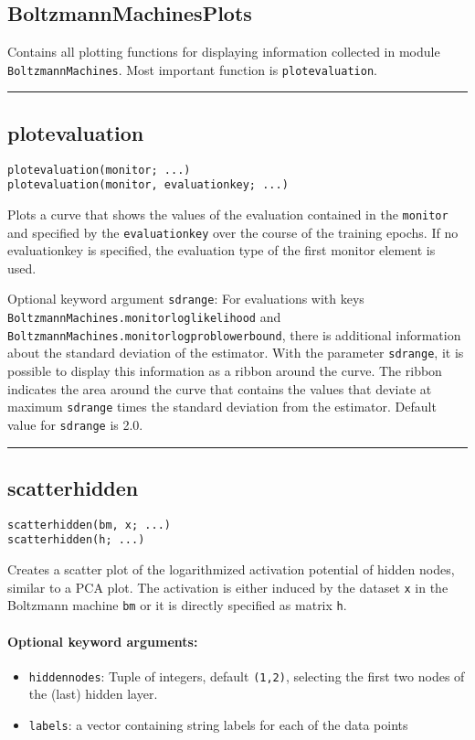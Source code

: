 \subsection*{BoltzmannMachinesPlots}  \label{bmplots_BoltzmannMachinesPlots}
Contains all plotting functions for displaying information collected in module \texttt{BoltzmannMachines}. Most important function is \texttt{plotevaluation}.

\noindent\rule{\textwidth}{1pt}
\subsection*{plotevaluation}  \label{bmplots_plotevaluation}
\begin{verbatim}
plotevaluation(monitor; ...)
plotevaluation(monitor, evaluationkey; ...)
\end{verbatim}
Plots a curve that shows the values of the evaluation contained in the \texttt{monitor} and specified by the \texttt{evaluationkey} over the course of the training epochs. If no evaluationkey is specified, the evaluation type of the first monitor element is used.

Optional keyword argument \texttt{sdrange}: For evaluations with keys \texttt{BoltzmannMachines.monitorloglikelihood} and \texttt{BoltzmannMachines.monitorlogproblowerbound}, there is additional information about the standard deviation of the estimator. With the parameter \texttt{sdrange}, it is possible to display this information as a ribbon around the curve. The ribbon indicates the area around the curve that contains the values that deviate at maximum \texttt{sdrange} times the standard deviation from the estimator. Default value for \texttt{sdrange} is 2.0.

\noindent\rule{\textwidth}{1pt}
\subsection*{scatterhidden}  \label{bmplots_scatterhidden}
\begin{verbatim}
scatterhidden(bm, x; ...)
scatterhidden(h; ...)
\end{verbatim}
Creates a scatter plot of the logarithmized activation potential of hidden nodes, similar to a PCA plot. The activation is either induced by the dataset \texttt{x} in the Boltzmann machine \texttt{bm} or it is directly specified as matrix \texttt{h}.

\paragraph*{Optional keyword arguments:}
\begin{itemize}
\item \texttt{hiddennodes}: Tuple of integers, default \texttt{(1,2)}, selecting the first two nodes of the (last) hidden layer.


\item \texttt{labels}: a vector containing string labels for each of the data points

\end{itemize}
